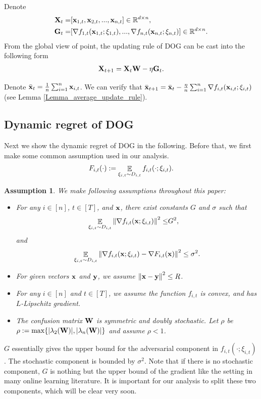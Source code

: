 \documentclass{article}
\newtheorem{Assumption}{\bf{Assumption}}
\begin{document}
 



Denote
\begin{align}
\nonumber
{\bf X}_t = &  [{\bf x}_{1,t}, {\bf x}_{2,t}, ..., {\bf x}_{n,t}] \in \mathbb{R}^{d\times n}, \\ \nonumber
{\bf G}_t = & [\nabla f_{1,t}({\bf x}_{1,t};\xi_{1,t}), ..., \nabla f_{n,t}({\bf x}_{n,t};\xi_{n,t})] \in \mathbb{R}^{d\times n}.
\end{align} 
From the global view of point, the updating rule of DOG can be cast into the following form
\begin{align}
\nonumber
{\bf X}_{t+1} = {\bf X}_{t}{\bf W} - \eta {\bf G}_t.
\end{align}

Denote $\bar{{\bf x}}_t = \frac{1}{n}\sum_{i=1}^n {\bf x}_{i,t}$. We can verify that $\bar{{\bf x}}_{t+1} =  \bar{{\bf x}}_t -  \frac{\eta}{n}\sum_{i=1}^n \nabla f_{i,t}({\bf x}_{i,t};\xi_{i,t})$ (see Lemma \ref{Lemma_average_update_rule}). 


\subsection{Dynamic regret of DOG}
\label{subsection_theoretical_analysis}
Next we show the dynamic regret of DOG in the following. Before that, we first make some common assumption used in our analysis. 
\begin{align}
\nonumber
F_{i,t}(\cdot) := \mathop{\mathbb{E}}_{\xi_{i,t} \sim D_{i,t}} f_{i,t}(\cdot; \xi_{i,t}).
\end{align}

\begin{Assumption}
\label{assumption_bounded_gradient_domain}
We make following assumptions throughout this paper:
\begin{itemize}
\item For any $i\in[n]$, $t\in[T]$, and ${\bf x}$, there exist constants $G$ and $\sigma$ such that
\begin{align}
\nonumber
\mathop{\mathbb{E}}_{ \xi_{i,t} \sim D_{i,t} }\left\lVert\nabla f_{i,t}({\bf x};\xi_{i,t})\right\rVert^2 \le &  G^2,
\end{align} and 
\begin{align}
\nonumber
\mathop{\mathbb{E}}_{ \xi_{i,t} \sim D_{i,t} } \left\lVert\nabla f_{i,t}({\bf x}; \xi_{i,t}) - \nabla F_{i,t}({\bf x})\right\rVert^2 \le \sigma^2.
\end{align}
\item For given vectors ${\bf x}$ and ${\bf y}$, we assume $\left\lVert{\bf x}-{\bf y}\right\rVert^2 \le R$.
\item  For any $i\in[n]$ and $t\in[T]$, we assume the function $f_{i,t}$ is convex, and has $L$-Lipschitz gradient. 
\item The confusion matrix ${\bf W}$ is symmetric and doubly stochastic. Let $\rho$ be $\rho := \max\{ |\lambda_2({\bf W})|, |\lambda_n({\bf W})| \}$ and assume $\rho <1$.
\end{itemize}
\end{Assumption}
$G$ essentially gives the upper bound for the adversarial component in $f_{i,t}(\cdot; \xi_{i,t})$. The stochastic component is bounded by $\sigma^2$. Note that if there is no stochastic component, $G$ is nothing but the upper bound of the gradient like the setting in many online learning literature. It is important for our analysis to split these two components, which will be clear very soon. 
\end{document}
